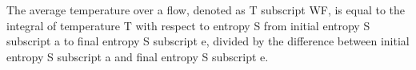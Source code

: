 The average temperature over a flow, denoted as T subscript WF, is equal to the integral of temperature T with respect to entropy S from initial entropy S subscript a to final entropy S subscript e, divided by the difference between initial entropy S subscript a and final entropy S subscript e.